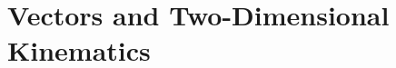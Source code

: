 \documentclass[]{flipit}
\begin{document}
\chapter{Vectors and Two-Dimensional Kinematics}

\lipsum[1-5]

\begin{question}
    \item \lipsum[3]
\end{question}

\begin{answer}
    \lipsum[5]
\end{answer}

\begin{question}
    \item ~
\end{question}

\begin{answer}
    \lipsum[11-12]
\end{answer}
\end{document}
